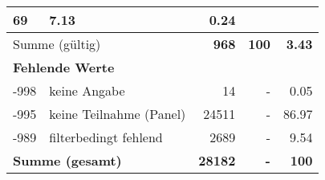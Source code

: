 \begin{longtable}{lXrrr}
       \num{69} &
       \num[round-mode=places,round-precision=2]{7.13} &
         \num[round-mode=places,round-precision=2]{0.24} \\
     \midrule
     \multicolumn{2}{l}{Summe (gültig)} &
       \textbf{\num{968}} &
     \textbf{100} &
       \textbf{\num[round-mode=places,round-precision=2]{3.43}} \\
     \multicolumn{5}{l}{\textbf{Fehlende Werte}}\\
       -998 &
       keine Angabe &
         \num{14} &
        - &
         \num[round-mode=places,round-precision=2]{0.05} \\
       -995 &
       keine Teilnahme (Panel) &
         \num{24511} &
        - &
         \num[round-mode=places,round-precision=2]{86.97} \\
       -989 &
       filterbedingt fehlend &
         \num{2689} &
        - &
         \num[round-mode=places,round-precision=2]{9.54} \\
     \midrule
     \multicolumn{2}{l}{\textbf{Summe (gesamt)}} &
          \textbf{\num{28182}} &
        \textbf{-} &
        \textbf{100} \\
     \bottomrule
     \end{longtable}
     
